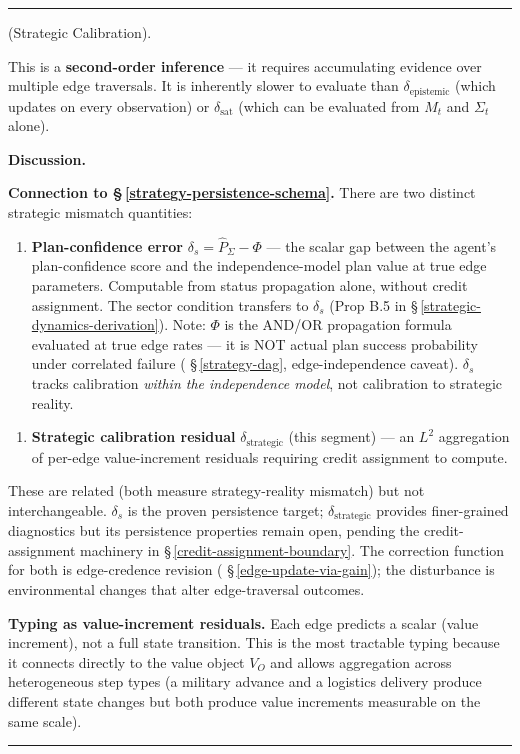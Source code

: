 \documentclass[11pt,oneside]{article}
\newcounter{claim}[section]
\renewcommand{\theclaim}{\thesection.\arabic{claim}}
\newenvironment{segment}[2]{%
  \refstepcounter{claim}%
  \bigskip\noindent\hrule\smallskip
  \noindent{\bfseries #1~\theclaim}\enskip(#2).\par\smallskip
  \noindent\ignorespaces
}{%
  \par\smallskip\noindent\hrule\bigskip
}
\newenvironment{definition}[1][]{\begin{segment}{Definition}{#1}}{\end{segment}}
\begin{document}
\begin{definition}[Strategic Calibration]
This is a \textbf{second-order inference} — it requires accumulating evidence over multiple edge traversals. It is inherently slower to evaluate than $\delta_{\text{epistemic}}$ (which updates on every observation) or $\delta_{\text{sat}}$ (which can be evaluated from $M_t$ and $\Sigma_t$ alone).


\medskip\noindent\textbf{Discussion.}


\textbf{Connection to \S\,\ref{strategy-persistence-schema}.} There are two distinct strategic mismatch quantities:

\begin{enumerate}
  \item \textbf{Plan-confidence error} $\delta_s = \hat P_\Sigma - \Phi$ — the scalar gap between the agent's plan-confidence score and the independence-model plan value at true edge parameters. Computable from status propagation alone, without credit assignment. The sector condition transfers to $\delta_s$ (Prop B.5 in \S\,\ref{strategic-dynamics-derivation}). Note: $\Phi$ is the AND/OR propagation formula evaluated at true edge rates — it is NOT actual plan success probability under correlated failure ( \S\,\ref{strategy-dag}, edge-independence caveat). $\delta_s$ tracks calibration \textit{within the independence model}, not calibration to strategic reality.
\end{enumerate}


\begin{enumerate}
  \item \textbf{Strategic calibration residual} $\delta_{\text{strategic}}$ (this segment) — an $L^2$ aggregation of per-edge value-increment residuals requiring credit assignment to compute.
\end{enumerate}


These are related (both measure strategy-reality mismatch) but not interchangeable. $\delta_s$ is the proven persistence target; $\delta_{\text{strategic}}$ provides finer-grained diagnostics but its persistence properties remain open, pending the credit-assignment machinery in \S\,\ref{credit-assignment-boundary}. The correction function for both is edge-credence revision ( \S\,\ref{edge-update-via-gain}); the disturbance is environmental changes that alter edge-traversal outcomes.

\textbf{Typing as value-increment residuals.} Each edge predicts a scalar (value increment), not a full state transition. This is the most tractable typing because it connects directly to the value object $V_O$ and allows aggregation across heterogeneous step types (a military advance and a logistics delivery produce different state changes but both produce value increments measurable on the same scale).


\end{definition}
\end{document}
